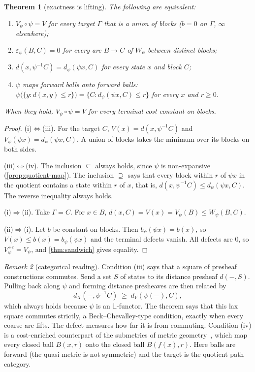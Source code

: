 \documentclass[11pt]{article}
\newtheorem{theorem}{Theorem}[section]
\theoremstyle{definition}
\theoremstyle{remark}
\newtheorem{remark}[theorem]{Remark}
\newcommand{\Lq}{\mathbb{L}}           %
\newcommand{\eps}{\varepsilon}
\newcommand{\dd}{d}
\begin{document}
\begin{theorem}[exactness is lifting]\label{thm:exact}
The following are equivalent:
\begin{enumerate}[label=(\roman*),nosep]
\item $V_\psi \circ \psi = V$ for every target $\Gamma$ that is a union of blocks
  ($b = 0$ on $\Gamma$, $\infty$ elsewhere);
\item $\eps_\psi(B,C) = 0$ for every arc $B \to C$ of $W_\psi$ between distinct
  blocks;
\item $\dd(x, \psi^{-1}C) = \dd_\psi(\psi x, C)$ for every state $x$ and block $C$;
\item $\psi$ maps forward balls onto forward balls:
  $\psi\big(\{y : \dd(x,y) \le r\}\big) = \{C : \dd_\psi(\psi x, C) \le r\}$ for
  every $x$ and $r \ge 0$.
\end{enumerate}
When they hold, $V_\psi \circ \psi = V$ for every terminal cost constant on blocks.
\end{theorem}
\begin{proof}
(i)$\Leftrightarrow$(iii). For the target $C$, $V(x) = \dd(x, \psi^{-1}C)$ and
$V_\psi(\psi x) = \dd_\psi(\psi x, C)$. A union of blocks takes the minimum over
its blocks on both sides.

(iii)$\Leftrightarrow$(iv). The inclusion $\subseteq$ always holds, since $\psi$ is
non-expansive (\cref{prop:quotient-map}). The inclusion $\supseteq$ says that every
block within $r$ of $\psi x$ in the quotient contains a state within $r$ of $x$,
that is, $\dd(x, \psi^{-1} C) \le \dd_\psi(\psi x, C)$. The reverse inequality
always holds.

(i)$\Rightarrow$(ii). Take $\Gamma = C$. For $x \in B$,
$\dd(x,C) = V(x) = V_\psi(B) \le W_\psi(B,C)$.

(ii)$\Rightarrow$(i). Let $b$ be constant on blocks. Then $b_\psi(\psi x) = b(x)$,
so $V(x) \le b(x) = b_\psi(\psi x)$ and the terminal defects vanish. All defects
are $0$, so $V_\psi^{+\eps} = V_\psi$, and \cref{thm:sandwich} gives equality.
\end{proof}

\begin{remark}[categorical reading]\label{rem:bc}
Condition (iii) says that a square of presheaf constructions commutes. Send a set
$S$ of states to its distance presheaf $\dd(-, S)$. Pulling back along $\psi$ and
forming distance presheaves are then related by
\[
\dd_X(-, \psi^{-1}C) \;\ge\; \dd_Y(\psi(-), C),
\]
which always holds because $\psi$ is an $\Lq$-functor. The theorem says that this
lax square commutes strictly, a Beck--Chevalley-type condition, exactly when every
coarse arc lifts. The defect measures how far it is from commuting.
Condition (iv) is a cost-enriched counterpart of the submetries of metric
geometry~\cite{berestovskii1987,berestovskii2000}, which map every closed ball
$B(x,r)$ onto the closed ball $B(f(x),r)$. Here
balls are forward (the quasi-metric is not symmetric) and the target is the
quotient path category.
\end{remark}
\end{document}
